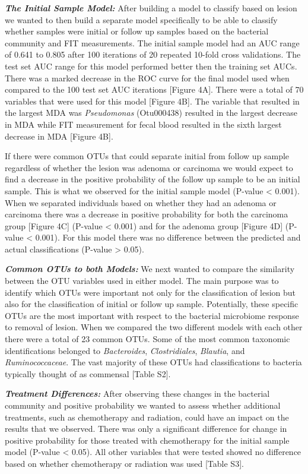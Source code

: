 \documentclass[12pt,]{article}
\begin{document}
\textbf{\emph{The Initial Sample Model:}} After building a model to
classify based on lesion we wanted to then build a separate model
specifically to be able to classify whether samples were initial or
follow up samples based on the bacterial community and FIT measurements.
The initial sample model had an AUC range of 0.641 to 0.805 after 100
iterations of 20 repeated 10-fold cross validations. The test set AUC
range for this model performed better then the training set AUCs. There
was a marked decrease in the ROC curve for the final model used when
compared to the 100 test set AUC iterations {[}Figure 4A{]}. There were
a total of 70 variables that were used for this model {[}Figure 4B{]}.
The variable that resulted in the largest MDA was \emph{Pseudomonas}
(Otu000438) resulted in the largest decrease in MDA while FIT
measurement for fecal blood resulted in the sixth largest decrease in
MDA {[}Figure 4B{]}.

If there were common OTUs that could separate initial from follow up
sample regardless of whether the lesion was adenoma or carcinoma we
would expect to find a decrease in the positive probability of the
follow up sample to be an initial sample. This is what we observed for
the initial sample model (P-value \textless{} 0.001). When we separated
individuals based on whether they had an adenoma or carcinoma there was
a decrease in positive probability for both the carcinoma group
{[}Figure 4C{]} (P-value \textless{} 0.001) and for the adenoma group
{[}Figure 4D{]} (P-value \textless{} 0.001). For this model there was no
difference between the predicted and actual classifications (P-value
\textgreater{} 0.05).

\textbf{\emph{Common OTUs to both Models:}} We next wanted to compare
the similarity between the OTU variables used in either model. The main
purpose was to identify which OTUs were important not only for the
classification of lesion but also for the classification of initial or
follow up sample. Potentially, these specific OTUs are the most
important with respect to the bacterial microbiome response to removal
of lesion. When we compared the two different models with each other
there were a total of 23 common OTUs. Some of the most common taxonomic
identifications belonged to \emph{Bacteroides}, \emph{Clostridiales},
\emph{Blautia}, and \emph{Ruminococcaceae}. The vast majority of these
OTUs had classifications to bacteria typically thought of as commensal
{[}Table S2{]}.

\textbf{\emph{Treatment Differences:}} After observing these changes in
the bacterial community and positive probability we wanted to assess
whether additional treatments, such as chemotherapy and radiation, could
have an impact on the results that we observed. There was only a
significant difference for change in positive probability for those
treated with chemotherapy for the initial sample model (P-value
\textless{} 0.05). All other variables that were tested showed no
difference based on whether chemotherapy or radiation was used {[}Table
S3{]}.
\end{document}
